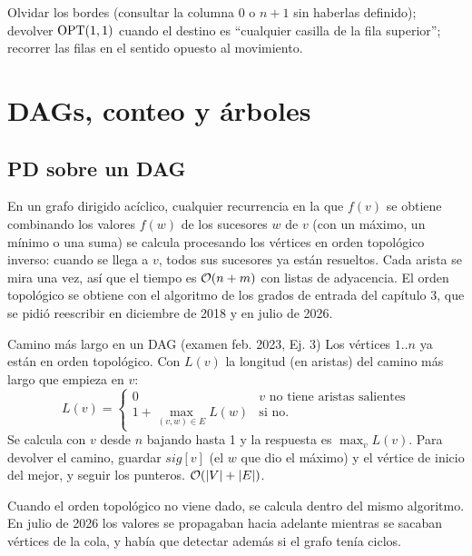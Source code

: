 \begin{trampa}[grillas]
Olvidar los bordes (consultar la columna 0 o $n+1$ sin haberlas definido);
devolver $\mathrm{OPT}(1,1)$ cuando el destino es ``cualquier casilla de la fila
superior''; recorrer las filas en el sentido opuesto al movimiento.
\end{trampa}

\section{DAGs, conteo y árboles}

\subsection{PD sobre un DAG}

En un grafo dirigido acíclico, cualquier recurrencia en la que $f(v)$ se
obtiene combinando los valores $f(w)$ de los sucesores $w$ de $v$ (con un
máximo, un mínimo o una suma) se calcula procesando
los vértices en orden topológico inverso: cuando se llega a $v$, todos sus
sucesores ya están resueltos. Cada arista se mira una vez, así que el tiempo
es $\mathcal{O}(n+m)$ con listas de adyacencia. El orden topológico se obtiene con
el algoritmo de los grados de entrada del capítulo 3, que se pidió
reescribir en diciembre de 2018 y en julio de 2026.

\begin{problema}{Camino más largo en un DAG (examen feb. 2023, Ej. 3)}
Los vértices $1..n$ ya están en orden topológico. Con $L(v)$ la longitud
(en aristas) del camino más largo que empieza en $v$:
\[
L(v)=\begin{cases}0 & v\text{ no tiene aristas salientes}\\ 1+\max_{(v,w)\in E}L(w) & \text{si no.}\end{cases}
\]
Se calcula con $v$ desde $n$ bajando hasta 1 y la respuesta es $\max_vL(v)$.
Para devolver el camino, guardar $\mathit{sig}[v]$ (el $w$ que dio el máximo) y el
vértice de inicio del mejor, y seguir los punteros. $\mathcal{O}(|V|+|E|)$.
\end{problema}

Cuando el orden topológico no viene dado, se calcula dentro del mismo
algoritmo. En julio de 2026 los valores se propagaban hacia adelante mientras
se sacaban vértices de la cola, y había que detectar además si el grafo tenía
ciclos.

